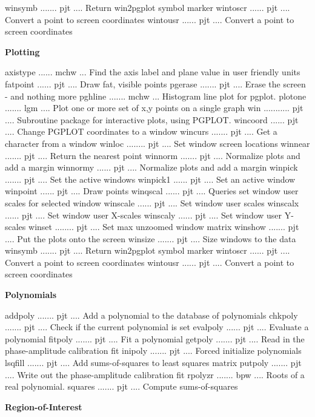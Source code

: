 {\eightpoint\begintt
winsymb ....... pjt .... Return win2pgplot symbol marker
wintoscr ...... pjt .... Convert a point to screen coordinates
wintousr ...... pjt .... Convert a point to screen coordinates
\endtt}
\par\centerline{\bf Plotting}
{\eightpoint\begintt
axistype ...... mchw ... Find the axis label and plane value in user friendly units
fatpoint ...... pjt .... Draw fat, visible points
pgerase ....... pjt .... Erase the screen - and nothing more
pghline ....... mchw ... Histogram line plot for pgplot.
plotone ....... lgm .... Plot one or more set of x,y points on a single graph
\endtt}
{\eightpoint\begintt
win ........... pjt .... Subroutine package for interactive plots, using PGPLOT.
wincoord ...... pjt .... Change PGPLOT coordinates to a window
wincurs ....... pjt .... Get a character from a window
winloc ........ pjt .... Set window screen locations
winnear ....... pjt .... Return the nearest point
\endtt}
{\eightpoint\begintt
winnorm ....... pjt .... Normalize plots and add a margin
winnormy ...... pjt .... Normalize plots and add a margin
winpick ....... pjt .... Set the active windows
winpick1 ...... pjt .... Set an active window
winpoint ...... pjt .... Draw points
\endtt}
{\eightpoint\begintt
winqscal ...... pjt .... Queries set window user scales for selected window
winscale ...... pjt .... Set window user scales
winscalx ...... pjt .... Set window user X-scales
winscaly ...... pjt .... Set window user Y-scales
winset ........ pjt .... Set max unzoomed window matrix
\endtt}
{\eightpoint\begintt
winshow ....... pjt .... Put the plots onto the screen
winsize ....... pjt .... Size windows to the data
winsymb ....... pjt .... Return win2pgplot symbol marker
wintoscr ...... pjt .... Convert a point to screen coordinates
wintousr ...... pjt .... Convert a point to screen coordinates
\endtt}
\par\centerline{\bf Polynomials}
{\eightpoint\begintt
addpoly ....... pjt .... Add a polynomial to the database of polynomials
chkpoly ....... pjt .... Check if the current polynomial is set
evalpoly ...... pjt .... Evaluate a polynomial
fitpoly ....... pjt .... Fit a polynomial
getpoly ....... pjt .... Read in the phase-amplitude calibration fit
\endtt}
{\eightpoint\begintt
inipoly ....... pjt .... Forced initialize polynomials
lsqfill ....... pjt .... Add sums-of-squares to least squares matrix
putpoly ....... pjt .... Write out the phase-amplitude calibration fit
rpolyzr ....... bpw .... Roots of a real polynomial.
squares ....... pjt .... Compute sums-of-squares
\endtt}
\par\centerline{\bf Region-of-Interest}

